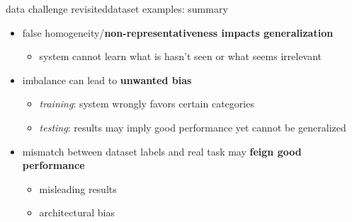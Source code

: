 \begin{frame}{data challenge revisited}{dataset examples: summary}
		\begin{itemize}
			\item 	false homogeneity/\textbf{non-representativeness impacts generalization}
				\begin{itemize}
					\item system cannot learn what is hasn't seen or what seems irrelevant
				\end{itemize}
			\bigskip
			\item		imbalance can lead to \textbf{unwanted bias} 
				\begin{itemize}
					\item 	\textit{training}: system wrongly favors certain categories
					\item		\textit{testing}: results may imply good performance yet cannot be generalized
				\end{itemize}
			\bigskip
			\item		mismatch between dataset labels and real task may \textbf{feign good performance}
				\begin{itemize}
					\item 	misleading results
					\item		architectural bias
				\end{itemize}
		\end{itemize}
\end{frame}